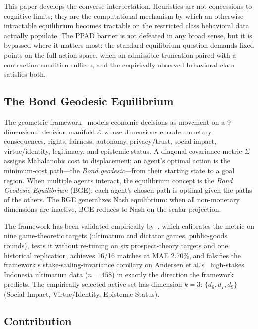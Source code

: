 \documentclass[11pt]{article}
\theoremstyle{definition}
\theoremstyle{remark}
\newcommand{\E}{\mathcal{E}}
\begin{document}
This paper develops the converse interpretation. Heuristics are not concessions to cognitive limits;
they are the computational mechanism by which an otherwise intractable equilibrium becomes tractable
on the restricted class behavioral data actually populate. The PPAD barrier is not defeated in any
broad sense, but it is bypassed where it matters most: the standard equilibrium question demands
fixed points on the full action space, when an admissible truncation paired with a contraction
condition suffices, and the empirically observed behavioral class satisfies both.

\subsection{The Bond Geodesic Equilibrium}

The geometric framework~\cite{bond2026geometric,bond2026tcss} models economic decisions as
movement on a 9-dimensional decision manifold $\E$ whose dimensions encode monetary consequences,
rights, fairness, autonomy, privacy/trust, social impact, virtue/identity, legitimacy, and epistemic
status. A diagonal covariance metric $\Sigma$ assigns Mahalanobis cost to displacement; an agent's
optimal action is the minimum-cost path---the \emph{Bond geodesic}---from their starting state to a
goal region. When multiple agents interact, the equilibrium concept is the \emph{Bond Geodesic
Equilibrium} (BGE): each agent's chosen path is optimal given the paths of the others. The BGE
generalizes Nash equilibrium: when all non-monetary dimensions are inactive, BGE reduces to Nash on
the scalar projection.

The framework has been validated empirically by~\cite{bond2026tcss}, which calibrates the metric on
nine game-theoretic targets (ultimatum and dictator games, public-goods rounds), tests it without
re-tuning on six prospect-theory targets and one historical replication, achieves 16/16 matches at
MAE 2.70\%, and falsifies the framework's stake-scaling-invariance corollary on
Andersen et al.'s~\cite{andersen2011} high-stakes Indonesia ultimatum data ($n{=}458$) in exactly the
direction the framework predicts. The empirically selected active set has dimension $k=3$:
$\{d_6, d_7, d_9\}$ (Social Impact, Virtue/Identity, Epistemic Status).

\subsection{Contribution}
\end{document}
